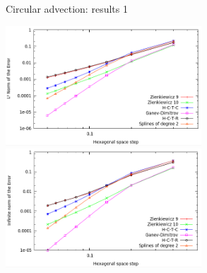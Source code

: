 \documentclass[]{beamer}
\begin{document}
\begin{frame}{Circular advection: results 1}

    \hspace*{2.cm}
\includegraphics[width=0.55\textwidth]{l2.png}\\
    \hspace*{2.cm}
\includegraphics[width=0.55\textwidth]{inf_l.png}
\end{frame}
%
%	
%	
\end{document}
